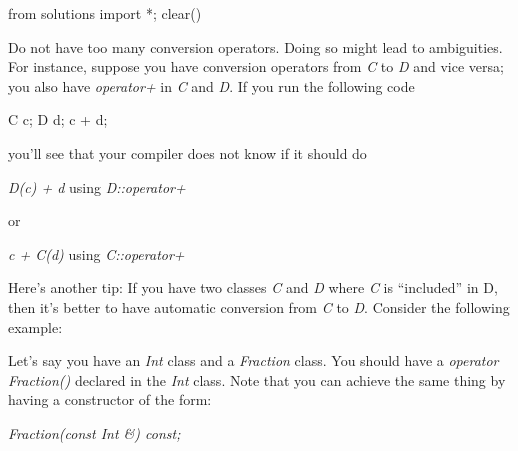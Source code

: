 \begin{python0}
from solutions import *; clear()
\end{python0}

Do not have too many conversion operators. Doing so might lead to
ambiguities. For instance, suppose you have conversion operators from
\textit{C} to \textit{D} and vice versa; you also have \textit{operator+} in
\textit{C} and \textit{D}. If you run the following code

\begin{consolethree}[escapeinside=||]
C c;
D d;
c + d;
\end{consolethree}

you'll see that your compiler does not know if it should do

\textit{D(c) + d} using \textit{D::operator+}

or

\textit{c + C(d)} using \textit{C::operator+}

Here's another tip: If you have two classes \textit{C} and
\textit{D} where \textit{C} is ``included'' in D, then it's
better to have automatic conversion from \textit{C} to \textit{D}. Consider
the following example:

Let's say you have an \textit{Int} class and a
\textit{Fraction} class. You should have a \textit{operator Fraction()}
declared in the \textit{Int} class. Note that you can achieve the same
thing by having a constructor of the form:

\textit{Fraction(const Int \&) const;}



